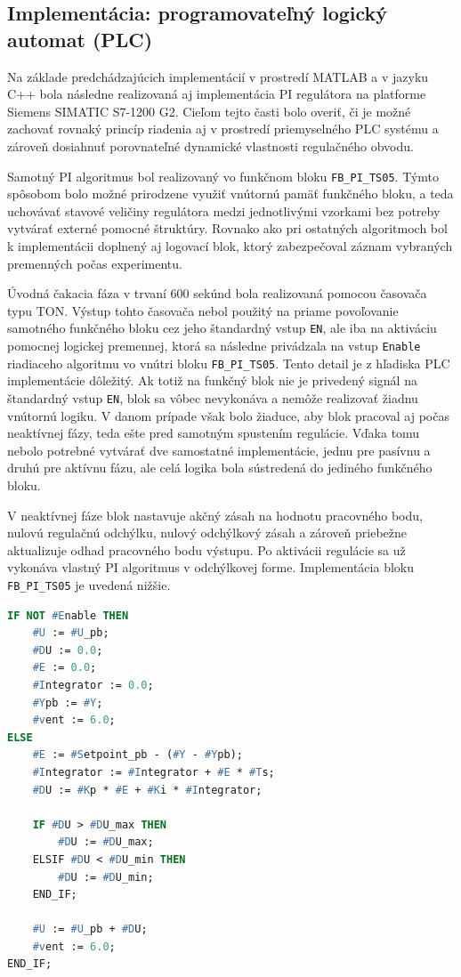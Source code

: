 \subsection{Implementácia: programovateľný logický automat (PLC)}
\label{sec:pi_plc_system}

Na základe predchádzajúcich implementácií v prostredí MATLAB a v jazyku C++
bola následne realizovaná aj implementácia PI regulátora na platforme
Siemens SIMATIC S7-1200 G2. Cieľom tejto časti bolo overiť, či je možné
zachovať rovnaký princíp riadenia aj v prostredí priemyselného PLC systému
a zároveň dosiahnuť porovnateľné dynamické vlastnosti regulačného obvodu.

Samotný PI algoritmus bol realizovaný vo funkčnom bloku \texttt{FB\_PI\_TS05}.
Týmto spôsobom bolo možné prirodzene využiť vnútornú pamäť funkčného bloku,
a teda uchovávať stavové veličiny regulátora medzi jednotlivými vzorkami bez
potreby vytvárať externé pomocné štruktúry. Rovnako ako pri ostatných algoritmoch
bol k implementácii doplnený aj logovací blok, ktorý zabezpečoval záznam
vybraných premenných počas experimentu.

Úvodná čakacia fáza v trvaní 600 sekúnd bola realizovaná pomocou časovača typu
TON. Výstup tohto časovača nebol použitý na priame povoľovanie samotného
funkčného bloku cez jeho štandardný vstup \texttt{EN}, ale iba na aktiváciu
pomocnej logickej premennej, ktorá sa následne privádzala na vstup \texttt{Enable}
riadiaceho algoritmu vo vnútri bloku \texttt{FB\_PI\_TS05}. Tento detail je z
hľadiska PLC implementácie dôležitý. Ak totiž na funkčný blok nie je privedený
signál na štandardný vstup \texttt{EN}, blok sa vôbec nevykonáva a nemôže
realizovať žiadnu vnútornú logiku. V danom prípade však bolo žiaduce, aby blok
pracoval aj počas neaktívnej fázy, teda ešte pred samotným spustením regulácie.
Vďaka tomu nebolo potrebné vytvárať dve samostatné implementácie, jednu pre
pasívnu a druhú pre aktívnu fázu, ale celá logika bola sústredená do jediného
funkčného bloku.

V neaktívnej fáze blok nastavuje akčný zásah na hodnotu pracovného bodu,
nulovú regulačnú odchýlku, nulový odchýlkový zásah a zároveň priebežne
aktualizuje odhad pracovného bodu výstupu. Po aktivácii regulácie sa už
vykonáva vlastný PI algoritmus v odchýlkovej forme. Implementácia bloku
\texttt{FB\_PI\_TS05} je uvedená nižšie.

\begin{lstlisting}[language=Pascal,
caption={Implementácia funkčného bloku \texttt{FB\_PI\_TS05} v PLC Siemens},
label={lst:fb-pi-ts05}]
IF NOT #Enable THEN
    #U := #U_pb;
    #DU := 0.0;
    #E := 0.0;
    #Integrator := 0.0;
    #Ypb := #Y;
    #vent := 6.0;
ELSE
    #E := #Setpoint_pb - (#Y - #Ypb);
    #Integrator := #Integrator + #E * #Ts;
    #DU := #Kp * #E + #Ki * #Integrator;

    IF #DU > #DU_max THEN
        #DU := #DU_max;
    ELSIF #DU < #DU_min THEN
        #DU := #DU_min;
    END_IF;

    #U := #U_pb + #DU;
    #vent := 6.0;
END_IF;
\end{lstlisting}

